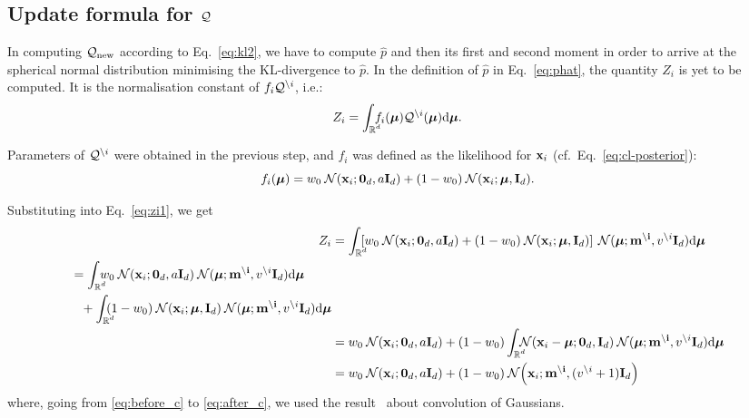 \documentclass[11pt]{article}
\begin{document}
\subsection*{Update formula for $\mathcal{Q}$}
In computing $\mathcal{Q}_{\text{new}}$ according to Eq.~\eqref{eq:kl2}, we have
to compute $\hat{p}$ and then its first and second moment in order to 
arrive at the spherical normal distribution minimising the KL-divergence to 
$\hat{p}$. In the definition of $\hat{p}$ in Eq.~\eqref{eq:phat}, the 
quantity $Z_i$ is yet to be computed. It is the normalisation constant of 
$f_i\mathcal{Q}^{\setminus i}$, i.e.:
\begin{equation}
	Z_i = \intrc f_i(\boldsymbol{\mu})\kve^{\setminus i}(\boldsymbol{\mu})\byd\boldsymbol{\mu}.
	\label{eq:zi1}
\end{equation}

Parameters of $\mathcal{Q}^{\setminus i}$ were obtained in the previous step, 
and $f_i$ was defined as the likelihood for $\mathbf{x}_i$ (cf.\ 
Eq.~\eqref{eq:cl-posterior}):
\begin{equation}
	f_i(\boldsymbol{\mu}) = w_0 \:\mathcal{N}(\mathbf{x}_i; \mathbf{0}_d, a\mathbf{I}_{d}) + (1 - w_0) 
\:\mathcal{N}(\mathbf{x}_i; \boldsymbol{\mu}, \mathbf{I}_{d}).
\end{equation}

Substituting into Eq.~\eqref{eq:zi1}, we get
\begin{align}
	Z_i &= \intrc \left[w_0  \norm(\vek{x}_i; \vek{0}_d, a\unity_{d})
										 + (1 - w_0) \norm(\vek{x}_i; \boldsymbol{\mu}, \unity_{d})\right]
							 \norm(\boldsymbol{\mu}; \vek{m^{\setminus i}}, v^{\setminus i}\unity_{d})
					\byd\boldsymbol{\mu} \\
			\begin{split}
				 &=\intrc w_0  \norm(\vek{x}_i; \vek{0}_d, a\unity_{d})
							 \norm(\boldsymbol{\mu}; \vek{m^{\setminus i}}, v^{\setminus i}\unity_{d})
					\byd\boldsymbol{\mu}\\
			&\hphantom{=}+  \intrc (1 - w_0) \norm(\vek{x}_i; \boldsymbol{\mu}, 
							 \unity_{d})
							 \norm(\boldsymbol{\mu}; \vek{m^{\setminus i}}, v^{\setminus i}\unity_{d})
					\byd\boldsymbol{\mu}
				 \end{split} \\
			&= w_0  \norm(\vek{x}_i; \vek{0}_d, a\unity_{d})
			+  (1 - w_0) \intrcc\norm(\vek{x}_i - \boldsymbol{\mu}; \vek{0}_d, 
							 \unity_{d})
							 \norm(\boldsymbol{\mu}; \vek{m^{\setminus i}}, v^{\setminus i}\unity_{d})
					\byd\boldsymbol{\mu}
			\label{eq:before_c} \\
			&= w_0  \norm(\vek{x}_i; \vek{0}_d, a\unity_{d})
			+  (1 - w_0)\norm\!\left(\vek{x}_i; \vek{m^{\setminus i}}, (v^{\setminus i} 
+ 1)\unity_{d}\right)
			\label{eq:after_c}
\end{align}
where, going from \eqref{eq:before_c} to \eqref{eq:after_c}, we used the 
result~\cite{tina-2003} about convolution of Gaussians.
\end{document}
